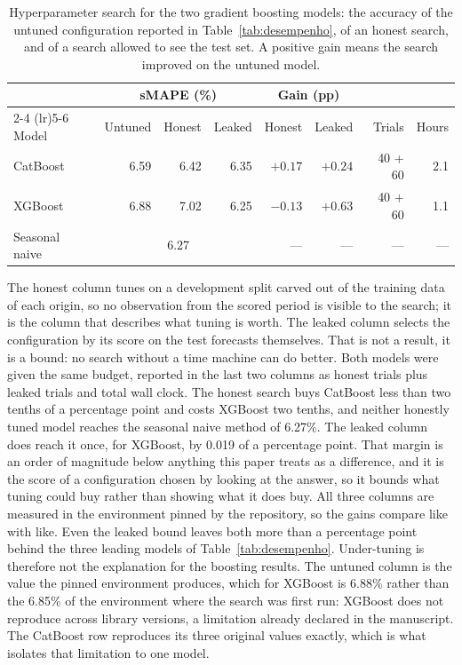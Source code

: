 \begin{table}[htbp]
\centering
\small
\setlength{\tabcolsep}{4pt}
\caption{Hyperparameter search for the two gradient boosting models: the accuracy of the
untuned configuration reported in Table~\ref{tab:desempenho}, of an honest search, and of
a search allowed to see the test set. A positive gain means the search improved on the
untuned model.}
\label{tab:optuna}
\begin{tabular}{lrrrrrrr}
\toprule
& \multicolumn{3}{c}{sMAPE (\%)} & \multicolumn{2}{c}{Gain (pp)} & & \\
\cmidrule(lr){2-4} \cmidrule(lr){5-6}
Model & Untuned & Honest & Leaked & Honest & Leaked & Trials & Hours \\
\midrule
CatBoost & 6.59 & 6.42 & 6.35 & $+0.17$ & $+0.24$ & 40 + 60 & 2.1 \\
XGBoost & 6.88 & 7.02 & 6.25 & $-0.13$ & $+0.63$ & 40 + 60 & 1.1 \\
\midrule
Seasonal naive & \multicolumn{3}{c}{6.27} & --- & --- & --- & --- \\
\bottomrule
\end{tabular}

\vspace{0.5em}
\begin{minipage}{\textwidth}
\footnotesize
The honest column tunes on a development split carved out of the training data of each
origin, so no observation from the scored period is visible to the search; it is the column
that describes what tuning is worth. The leaked column selects the configuration by its
score on the test forecasts themselves. That is not a result, it is a bound: no search
without a time machine can do better. Both models were given the same budget, reported in
the last two columns as honest trials plus leaked trials and total wall clock. The honest
search buys CatBoost less than two tenths of a percentage point and costs XGBoost two
tenths, and neither honestly tuned model reaches the seasonal naive method of
6.27\%. The leaked column does reach it once, for XGBoost, by
0.019 of a percentage point. That margin is an
order of magnitude below anything this paper treats as a difference, and it is the
score of a configuration chosen by looking at the answer, so it bounds what tuning
could buy rather than showing what it does buy. All three columns are measured in
the environment pinned by the repository, so the gains compare like with like.
Even the leaked bound leaves both more than a percentage point behind the three leading
models of Table~\ref{tab:desempenho}. Under-tuning is therefore not the explanation for
the boosting results. The untuned column is the value the pinned environment produces, which for
XGBoost is 6.88\% rather than the
6.85\% of the environment where the search was first run: XGBoost does not
reproduce across library versions, a limitation already declared in the manuscript. The
CatBoost row reproduces its three original values exactly, which is what isolates that
limitation to one model.
\end{minipage}
\end{table}